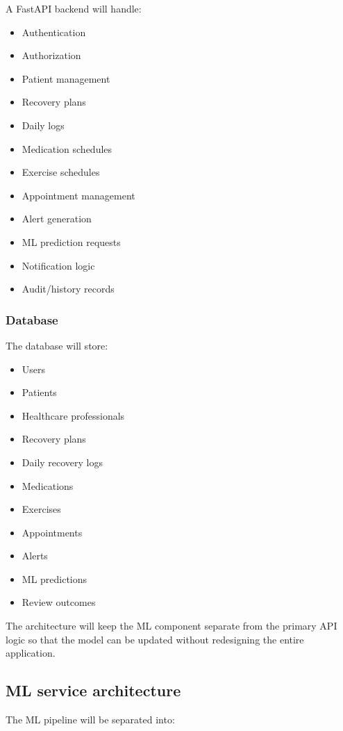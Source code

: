 \documentclass[11pt,a4paper]{article}
\begin{document}
A FastAPI backend will handle:
\begin{itemize}[leftmargin=0.7cm]
    \item Authentication
    \item Authorization
    \item Patient management
    \item Recovery plans
    \item Daily logs
    \item Medication schedules
    \item Exercise schedules
    \item Appointment management
    \item Alert generation
    \item ML prediction requests
    \item Notification logic
    \item Audit/history records
\end{itemize}

\subsubsection{Database}

The database will store:
\begin{itemize}[leftmargin=0.7cm]
    \item Users
    \item Patients
    \item Healthcare professionals
    \item Recovery plans
    \item Daily recovery logs
    \item Medications
    \item Exercises
    \item Appointments
    \item Alerts
    \item ML predictions
    \item Review outcomes
\end{itemize}

The architecture will keep the ML component separate from the
primary API logic so that the model can be updated without redesigning the
entire application.

\subsection{ML service architecture}

The ML pipeline will be separated into:
\end{document}
